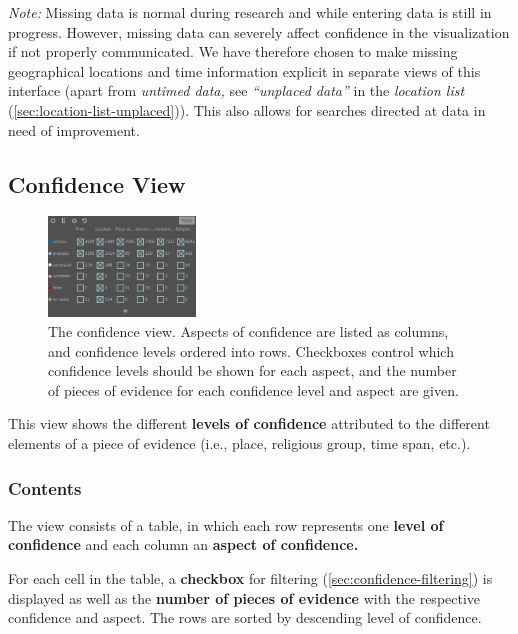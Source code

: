 \emph{Note:} Missing data is normal during research and while entering data is still in progress.
However, missing data can severely affect confidence in the visualization if not properly communicated.
We have therefore chosen to make missing geographical locations and time information explicit in separate views of this interface (apart from \emph{untimed data,} see \emph{\enquote{unplaced data}} in the \emph{location list} (\cref{sec:location-list-unplaced})).
This also allows for searches directed at data in need of improvement.


\subsection{Confidence View}
\label{sec:confidence}

\begin{figure}[tb]
  \centering
  \includegraphics[width=0.35\textwidth]{../src/assets/visualization-documentation/confidence.png}
  \caption{
    The confidence view.
    Aspects of confidence are listed as columns, and confidence levels ordered into rows.
    Checkboxes control which confidence levels should be shown for each aspect, and the number of pieces of evidence for each confidence level and aspect are given.
  }
  \label{fig:confidence}
\end{figure}

This view shows the different \textbf{levels of confidence} attributed to the different elements of a piece of evidence (i.e., place, religious group, time span, etc.).

\subsubsection{Contents}

The view consists of a table, in which each row represents one \textbf{level of confidence} and each column an \textbf{aspect of confidence.}

For each cell in the table, a \textbf{checkbox} for filtering (\cref{sec:confidence-filtering}) is displayed as well as the \textbf{number of pieces of evidence} with the respective confidence and aspect.
The rows are sorted by descending level of confidence.

